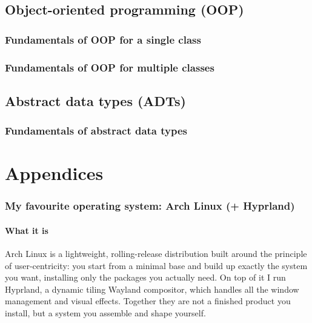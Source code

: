 \documentclass[a4paper,12pt]{article}
\begin{document}
\subsection{Object-oriented programming (OOP)}
\subsubsection{Fundamentals of OOP for a single class}
\subsubsection{Fundamentals of OOP for multiple classes}
\subsection{Abstract data types (ADTs)}
\subsubsection{Fundamentals of abstract data types}
\newpage
\section{Appendices}
\subsubsection{My favourite operating system: Arch Linux (+ Hyprland)}
\paragraph{What it is}
Arch Linux is a lightweight, rolling-release distribution built around the principle of user-centricity: you start from a minimal base and build up exactly the system you want, installing only the packages you actually need. On top of it I run Hyprland, a dynamic tiling Wayland compositor, which handles all the window management and visual effects. Together they are not a finished product you install, but a system you assemble and shape yourself.
\end{document}
